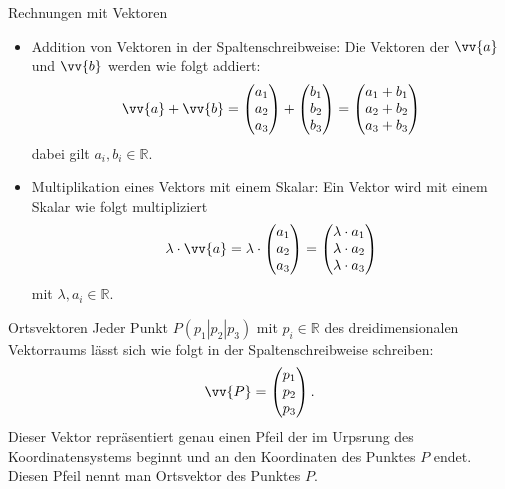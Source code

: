 \begin{bem}{Rechnungen mit Vektoren}{}
\begin{itemize}
    \item Addition von Vektoren in der Spaltenschreibweise: Die Vektoren der $\vv{a}$ und $\vv{b}$ werden wie folgt addiert: $$\vv{a} + \vv{b} = \begin{pmatrix} a_1 \\ a_2 \\a_3 \end{pmatrix} + \begin{pmatrix} b_1 \\ b_2 \\b_3 \end{pmatrix} = \begin{pmatrix} a_1 + b_1 \\ a_2 + b_2 \\a_3 + b_3 \end{pmatrix}$$ dabei gilt $a_i, b_i \in \mathds{R}$.
    \item Multiplikation eines Vektors mit einem Skalar: Ein Vektor wird mit einem Skalar wie folgt multipliziert $$\lambda \cdot \vv{a} = \lambda \cdot \begin{pmatrix} a_1 \\ a_2 \\a_3 \end{pmatrix} = \begin{pmatrix} \lambda \cdot a_1 \\ \lambda \cdot a_2 \\\lambda \cdot a_3 \end{pmatrix}$$ mit $\lambda , a_i \in \mathds{R}$.
\end{itemize}
\end{bem}
\begin{satz}{Ortsvektoren}{}
Jeder Punkt $P(p_1|p_2|p_3)$ mit $p_i \in \mathds{R}$ des dreidimensionalen Vektorraums lässt sich wie folgt in der Spaltenschreibweise schreiben:
$$\vv{P} = \begin{pmatrix} p_1 \\ p_2 \\p_3 \end{pmatrix}.$$ 
Dieser Vektor repräsentiert genau einen Pfeil der im Urpsrung des Koordinatensystems beginnt und an den Koordinaten des Punktes $P$ endet.\\ 
Diesen Pfeil nennt man Ortsvektor des Punktes $P$.
\end{satz}
